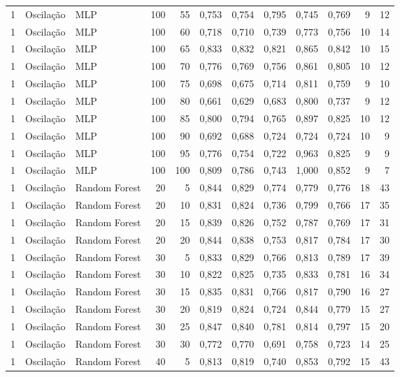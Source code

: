 \begin{longtable}{@{}rllrrrrrrrrr@{}}
1 & Oscilação & MLP & 100 & 55 & 0,753 & 0,754 & 0,795 & 0,745 & 0,769 & 9 & 12 \\
1 & Oscilação & MLP & 100 & 60 & 0,718 & 0,710 & 0,739 & 0,773 & 0,756 & 10 & 14 \\
1 & Oscilação & MLP & 100 & 65 & 0,833 & 0,832 & 0,821 & 0,865 & 0,842 & 10 & 15 \\
1 & Oscilação & MLP & 100 & 70 & 0,776 & 0,769 & 0,756 & 0,861 & 0,805 & 10 & 12 \\
1 & Oscilação & MLP & 100 & 75 & 0,698 & 0,675 & 0,714 & 0,811 & 0,759 & 9 & 10 \\
1 & Oscilação & MLP & 100 & 80 & 0,661 & 0,629 & 0,683 & 0,800 & 0,737 & 9 & 12 \\
1 & Oscilação & MLP & 100 & 85 & 0,800 & 0,794 & 0,765 & 0,897 & 0,825 & 10 & 12 \\
1 & Oscilação & MLP & 100 & 90 & 0,692 & 0,688 & 0,724 & 0,724 & 0,724 & 10 & 9 \\
1 & Oscilação & MLP & 100 & 95 & 0,776 & 0,754 & 0,722 & 0,963 & 0,825 & 9 & 9 \\
1 & Oscilação & MLP & 100 & 100 & 0,809 & 0,786 & 0,743 & 1,000 & 0,852 & 9 & 7 \\
1 & Oscilação & Random Forest & 20 & 5 & 0,844 & 0,829 & 0,774 & 0,779 & 0,776 & 18 & 43 \\
1 & Oscilação & Random Forest & 20 & 10 & 0,831 & 0,824 & 0,736 & 0,799 & 0,766 & 17 & 35 \\
1 & Oscilação & Random Forest & 20 & 15 & 0,839 & 0,826 & 0,752 & 0,787 & 0,769 & 17 & 31 \\
1 & Oscilação & Random Forest & 20 & 20 & 0,844 & 0,838 & 0,753 & 0,817 & 0,784 & 17 & 30 \\
1 & Oscilação & Random Forest & 30 & 5 & 0,833 & 0,829 & 0,766 & 0,813 & 0,789 & 17 & 39 \\
1 & Oscilação & Random Forest & 30 & 10 & 0,822 & 0,825 & 0,735 & 0,833 & 0,781 & 16 & 34 \\
1 & Oscilação & Random Forest & 30 & 15 & 0,835 & 0,831 & 0,766 & 0,817 & 0,790 & 16 & 27 \\
1 & Oscilação & Random Forest & 30 & 20 & 0,819 & 0,824 & 0,724 & 0,844 & 0,779 & 15 & 27 \\
1 & Oscilação & Random Forest & 30 & 25 & 0,847 & 0,840 & 0,781 & 0,814 & 0,797 & 15 & 20 \\
1 & Oscilação & Random Forest & 30 & 30 & 0,772 & 0,770 & 0,691 & 0,758 & 0,723 & 14 & 25 \\
1 & Oscilação & Random Forest & 40 & 5 & 0,813 & 0,819 & 0,740 & 0,853 & 0,792 & 15 & 43 \\

\end{longtable}
